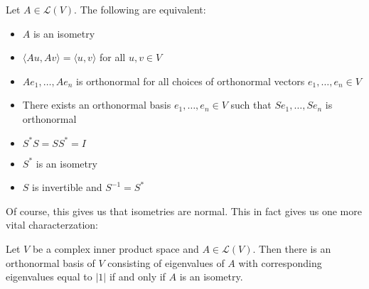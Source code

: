 \documentclass{memoir}
\begin{document}
\begin{prop}
	Let \(A \in \mathcal{L}(V)\). The following are equivalent:
	\begin{itemize}
		\item \(A\) is an isometry
		\item \(\langle Au,Av \rangle = \langle u,v \rangle \) for all \(u,v \in V\)
		\item \(Ae_1,\ldots,Ae_n\) is orthonormal for all choices of orthonormal vectors \(e_1,\ldots,e_n \in V\)
		\item There exists an orthonormal basis \(e_1,\ldots,e_n \in V\) such that \(Se_1,\ldots,Se_n\) is orthonormal
		\item \(S^{*}S = SS^{*}= I\) 
		\item \(S^{*}\) is an isometry
		\item \(S\) is invertible and \(S^{-1} = S^{*}\)
	\end{itemize}
\end{prop}
Of course, this gives us that isometries are normal. This in fact gives us one more vital characterzation:
\begin{prop}
	Let \(V\) be a complex inner product space and \(A \in \mathcal{L}(V)\). Then there is an orthonormal basis of \(V\) consisting of eigenvalues of \(A\) with corresponding eigenvalues equal to \(\left| 1 \right| \) if and only if \(A\) is an isometry.
\end{prop}
\end{document}
